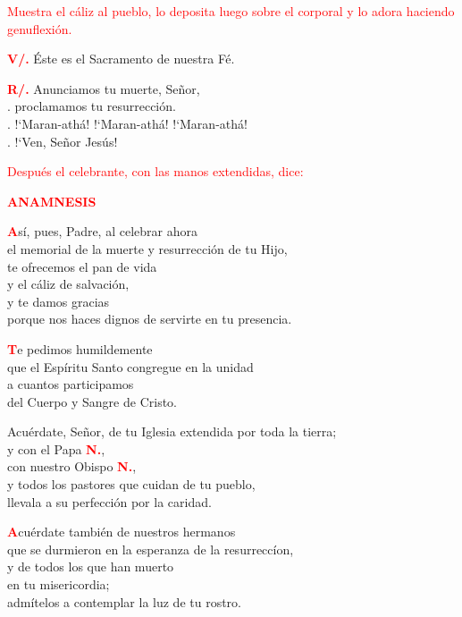 \documentclass[12pt, letterpaper]{report}
\begin{document}
	\large{\textcolor{red}{Muestra el c\'aliz al pueblo, lo deposita luego sobre el corporal y lo adora haciendo genuflexi\'on.}}

	\noindent
	\Large {\bfseries \textcolor{red}{V/.}} \hspace{0.5cm} \'Este es el Sacramento de nuestra F\'e.

	\noindent
	\Large {\bfseries \textcolor{red}{R/.}} \hspace{0.5cm} Anunciamos tu muerte, Se\~nor,\\
	. \hspace{1.5cm} proclamamos tu resurrecci\'on.\\
	. \hspace{1.5cm} !`Maran-ath\'a! !`Maran-ath\'a! !`Maran-ath\'a!\\
	. \hspace{1.5cm} !`Ven, Se\~nor Jes\'us!

	\newpage

	\large{\textcolor{red}{Despu\'es el celebrante, con las manos extendidas, dice:}}

	\Large {\bfseries \textcolor{red}{ANAMNESIS}}

	\lettrine[lines=2]{\bfseries \textcolor{red}{A}}{}\Large s\'i, pues, Padre, al celebrar ahora\\
	el memorial de la muerte y resurrecci\'on de tu Hijo,\\
	te ofrecemos el pan de vida\\
	y el c\'aliz de salvaci\'on,\\
	y te damos gracias\\
	porque nos haces dignos de servirte en tu presencia.

	\lettrine[lines=2]{\bfseries \textcolor{red}{T}}{}\Large e pedimos humildemente\\
	que el Esp\'iritu Santo congregue en la unidad\\
	a cuantos participamos\\
	del Cuerpo y Sangre de Cristo.

	\noindent
	Acu\'erdate, Se\~nor, de tu Iglesia extendida por toda la tierra; \\
	y con el Papa {\bfseries \textcolor{red}{N.}},\\
	con nuestro Obispo {\bfseries \textcolor{red}{N.}},\\
	y todos los pastores que cuidan de tu pueblo,\\
	llevala a su perfecci\'on por la caridad.

	\lettrine[lines=2]{\bfseries \textcolor{red}{A}}{}\Large cu\'erdate tambi\'en de nuestros hermanos\\
	que se durmieron en la esperanza de la resurrecc\'ion,\\
	y de todos los que han muerto\\
	en tu misericordia;\\
	adm\'itelos a contemplar la luz de tu rostro.
\end{document}
